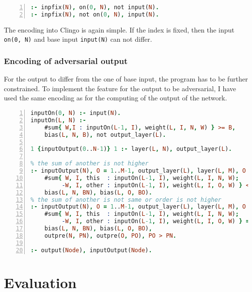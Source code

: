 \documentclass{fithesis}
\begin{document}
\begin{lstlisting}[language=prolog, numbers=left, countblanklines=false]
% input does not differ from base on fixed indices
:- inpfix(N), on(0, N), not input(N).
:- inpfix(N), not on(0, N), input(N).
\end{lstlisting}
The encoding into Clingo is again simple. If the index is fixed, then the
input \texttt{on(0, N)} and base input \texttt{input(N)} can not differ.

\subsection{Encoding of adversarial output}

For the output to differ from the one of base input, the program has to be
further constrained. To implement the feature for the output to be adversarial,
I have used the same encoding as for the computing of the output of the
network.

\begin{lstlisting}[language=prolog, numbers=left, countblanklines=false]
% Show only inputs with output nonequal to that of input vector
inputOn(0, N) :- input(N).
inputOn(L, N) :-
    #sum{ W,I : inputOn(L-1, I), weight(L, I, N, W) } >= B,
    bias(L, N, B), not output_layer(L).

1 {inputOutput(0..N-1)} 1 :- layer(L, N), output_layer(L).

% the sum of another is not higher
:- inputOutput(N), O = 1..M-1, output_layer(L), layer(L, M), O != N,
    #sum{ W, I, this  : inputOn(L-1, I), weight(L, I, N, W);
         -W, I, other : inputOn(L-1, I), weight(L, I, O, W) } < BO - BN,
    bias(L, N, BN), bias(L, O, BO).
% the sum of another is not same or order is not higher
:- inputOutput(N), O = 1..M-1, output_layer(L), layer(L, M), O != N,
    #sum{ W, I, this  : inputOn(L-1, I), weight(L, I, N, W);
         -W, I, other : inputOn(L-1, I), weight(L, I, O, W) } = BO - BN,
    bias(L, N, BN), bias(L, O, BO),
    outpre(N, PN), outpre(O, PO), PO > PN.

:- output(Node), inputOutput(Node).
\end{lstlisting}

\chapter{Evaluation}

\end{document}
